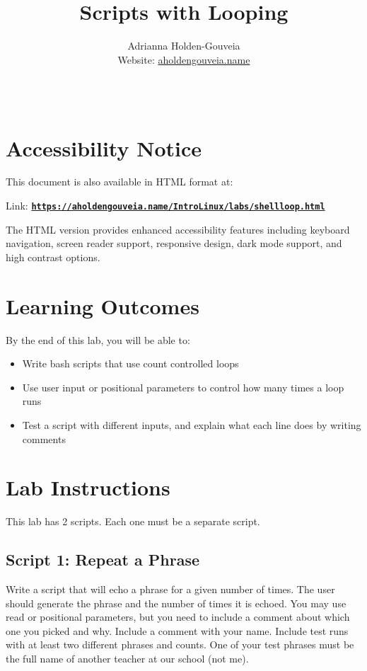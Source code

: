 \documentclass[12pt]{article}
\title{Scripts with Looping}
\author{
        Adrianna Holden-Gouveia \\
        Website: \href{https://aholdengouveia.name}{aholdengouveia.name}\\ 
        \date{\vspace{-5ex}}
        \faGithub {: aholdengouveia} \\
        }
\begin{document}
    

\maketitle

\section*{Accessibility Notice}
This document is also available in HTML format at:

Link: \href{https://aholdengouveia.name/IntroLinux/labs/shellloop.html}{\textbf{\nolinkurl{https://aholdengouveia.name/IntroLinux/labs/shellloop.html}}}

The HTML version provides enhanced accessibility features including keyboard navigation, screen reader support, responsive design, dark mode support, and high contrast options.


\section*{Learning Outcomes}
By the end of this lab, you will be able to:
\begin{itemize}
    \item Write bash scripts that use count controlled loops
    \item Use user input or positional parameters to control how many times a loop runs
    \item Test a script with different inputs, and explain what each line does by writing comments
\end{itemize}

\section*{Lab Instructions}
This lab has 2 scripts. Each one must be a separate script.

\subsection*{Script 1: Repeat a Phrase}
Write a script that will echo a phrase for a given number of times. The user should generate the phrase and the number of times it is echoed. You may use read or positional parameters, but you need to include a comment about which one you picked and why.  Include a comment with your name. Include test runs with at least two different phrases and counts. One of your test phrases must be the full name of another teacher at our school (not me).
\end{document}
